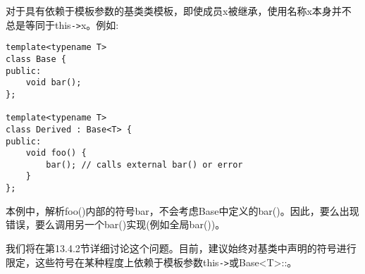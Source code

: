 对于具有依赖于模板参数的基类类模板，即使成员x被继承，使用名称x本身并不总是等同于this\texttt{->}x。例如:

\begin{lstlisting}[style=styleCXX]
template<typename T>
class Base {
public:
	void bar();
};

template<typename T>
class Derived : Base<T> {
public:
	void foo() {
		bar(); // calls external bar() or error
	}
};
\end{lstlisting}

本例中，解析foo()内部的符号bar，不会考虑Base中定义的bar()。因此，要么出现错误，要么调用另一个bar()实现(例如全局bar())。

我们将在第13.4.2节详细讨论这个问题。目前，建议始终对基类中声明的符号进行限定，这些符号在某种程度上依赖于模板参数this\texttt{->}或Base<T>::。














































